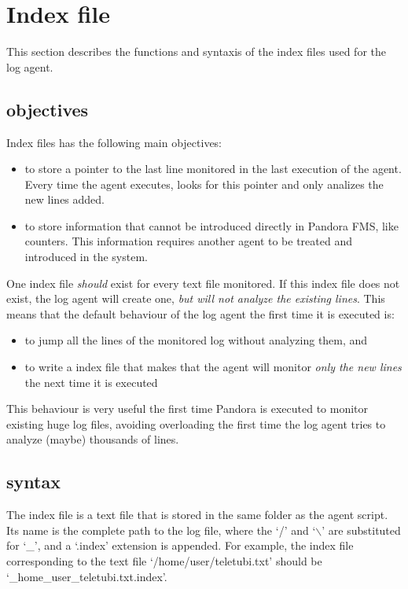 \documentclass[a4paper,10pt]{article}
\begin{document}
\section{Index file}\label{sec:indexfile}

This section describes the functions and syntaxis of the index files used for the log agent.

\subsection{objectives}

Index files has the following main objectives:

\begin{itemize}
\item to store a pointer to the last line monitored in the last execution of the agent. Every time the agent executes, looks for this pointer and only analizes the new lines added.
\item to store information that cannot be introduced directly in Pandora FMS, like counters. This information requires another agent to be treated and introduced in the system.
\end{itemize}

One index file \emph{should} exist for every text file monitored. If this index file does not exist, the log agent will create one, \emph{but will not analyze the existing lines}. This means that the default behaviour of the log agent the first time it is executed is:

\begin{itemize}
\item to jump all the lines of the monitored log without analyzing them,  and 
\item to write a index file that makes that the agent will monitor \emph{only the new lines} the next time it is executed
\end{itemize}

This behaviour is very useful the first time Pandora is executed to monitor existing huge log files, avoiding overloading the first time the log agent tries to analyze (maybe) thousands of lines.

\subsection{syntax}

The index file is a text file that is stored in the same folder as the agent script. Its name is the complete path to the log file, where the `/'  and `$\backslash$' are substituted for `\_', and a `.index' extension is appended. For example, the index file corresponding to the text file `/home/user/teletubi.txt' should be `\_home\_user\_teletubi.txt.index'.
\end{document}
